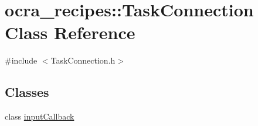 \hypertarget{classocra__recipes_1_1TaskConnection}{}\section{ocra\+\_\+recipes\+:\+:Task\+Connection Class Reference}
\label{classocra__recipes_1_1TaskConnection}


{\ttfamily \#include $<$Task\+Connection.\+h$>$}

\subsection*{Classes}
\begin{DoxyCompactItemize}
\item 
class \hyperlink{classocra__recipes_1_1TaskConnection_1_1inputCallback}{input\+Callback}
\end{DoxyCompactItemize}
